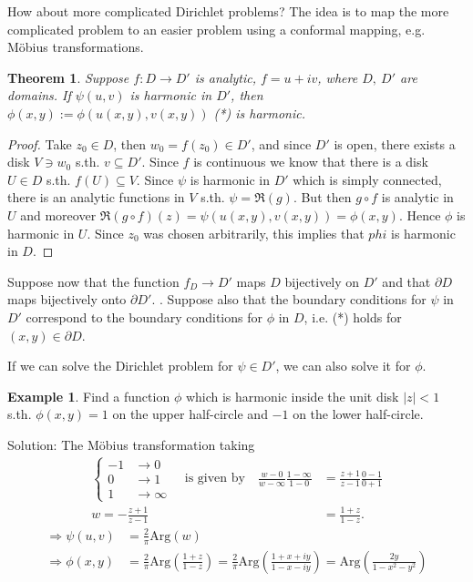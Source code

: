 \documentclass[12pt, a4paper]{article}
\theoremstyle{plain}
\newtheorem{thm}{Theorem} %
\theoremstyle{definition}
\newtheorem{example}{Example} %
\begin{document}
			How about more complicated Dirichlet problems? The idea is to map the more complicated problem to an easier problem using a conformal mapping, e.g. Möbius transformations.\\

			\begin{thm}
				Suppose $f:D\to D'$ is analytic, $f=u+iv$, where $D,\:D'$ are domains. If $\psi(u,v)$ is harmonic in $D'$, then $\phi(x,y):=\phi(u(x,y),v(x,y))$ (*) is harmonic.
			\end{thm}

			\begin{proof}
				Take $z_0\in D$, then $w_0=f(z_0)\in D'$, and since $D'$ is open, there exists a disk $V\ni w_0$ s.th. $v\subseteq D'$. Since $f$ is continuous we know that there is a disk $U\in D$ s.th. $f(U)\subseteq V$. Since $\psi$ is harmonic in $D'$ which is simply connected, there is an analytic functions in $V$ s.th. $\psi = \Re(g)$. But then $g\circ f$ is analytic in $U$ and moreover $\Re(g\circ f)(z) = \psi(u(x,y),v(x,y)) = \phi(x,y)$. Hence $\phi$ is harmonic in $U$. Since $z_0$ was chosen arbitrarily, this implies that $phi$ is harmonic in $D$.
			\end{proof}

			Suppose now that the function $f_D\to D'$ maps $D$ bijectively on $D'$ and that $\partial D$ maps bijectively onto $\partial D'$. . Suppose also that the boundary conditions for $\psi$ in $D'$ correspond to the boundary conditions for $\phi$ in $D$, i.e. (*) holds for $(x,y)\in\partial D$.

			If we can solve the Dirichlet problem for $\psi\in D'$, we can also solve it for $\phi$. \\

			\begin{example}
				Find a function $\phi$ which is harmonic inside the unit disk $|z|<1$ s.th. $\phi(x,y)=1$ on the upper half-circle and $-1$ on the lower half-circle.

				Solution: The Möbius transformation taking
				\begin{align*}
					\begin{cases}
						-1	&\to 0\\
						0	&\to 1\\
						1	&\to \infty
					\end{cases}
					\quad\text{is given by}\quad 
					\frac{w-0}{w-\infty}\frac{1-\infty}{1-0} &= \frac{z+1}{z-1}\frac{0-1}{0+1}\\
					w = - \frac{z+1}{z-1} &= \frac{1+z}{1-z}.
				\end{align*}
				\begin{align*}
					\Rightarrow \psi(u,v) &= \frac{2}{\pi}\mathrm{Arg}(w)\\
					\Rightarrow \phi(x,y) &= \frac{2}{\pi}\mathrm{Arg}\left(\frac{1+z}{1-z}\right) = 
					\frac{2}{\pi}\mathrm{Arg}\left(\frac{1+x+iy}{1-x-iy}\right) = 
					\mathrm{Arg}\left(\frac{2y}{1-x^2-y^2}\right)\\
				\end{align*}
			\end{example}
\end{document}
